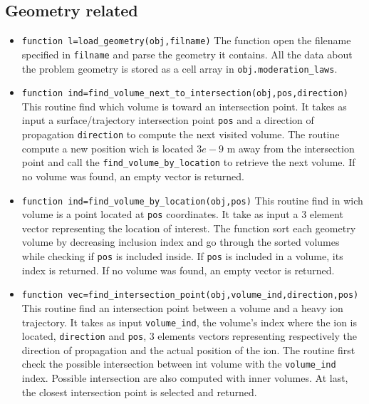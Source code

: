 \documentclass[10pt]{article}
\begin{document}
		\subsection{Geometry related}
		\begin{itemize}
		\item \lstinline{function l=load_geometry(obj,filname)} The function open the filename specified in \lstinline{filname} and parse the geometry it contains. All the data about the problem geometry is stored as a cell array in \lstinline{obj.moderation_laws}.
		\item \lstinline{function ind=find_volume_next_to_intersection(obj,pos,direction)} This  routine find which volume is toward an intersection point. It takes as input a surface/trajectory intersection point \lstinline{pos} and a direction of propagation \lstinline{direction} to compute the next visited volume. The routine compute a new position wich is located $3e-9$ m away from the intersection point and call the \lstinline{find_volume_by_location} to retrieve the next volume. If no volume was found, an empty vector is returned. 
		\item \lstinline{function ind=find_volume_by_location(obj,pos)} This routine find in wich volume is a point located  at \lstinline{pos} coordinates. It take as input a 3 element vector representing the location of interest. The function sort each geometry volume by decreasing inclusion index and go through the sorted volumes while checking if \lstinline{pos} is included inside. If \lstinline{pos} is included in a volume, its index is returned. If no volume was found, an empty vector is returned.
		\item \lstinline{function vec=find_intersection_point(obj,volume_ind,direction,pos)} This routine find an intersection point between a volume and a heavy ion trajectory. It takes as input \lstinline{volume_ind}, the volume's index where the ion is located, \lstinline{direction} and \lstinline{pos}, 3 elements vectors representing respectively the direction of propagation and the actual position of the ion. The routine first check the possible intersection between int volume with the  \lstinline{volume_ind} index. Possible intersection are also computed with inner volumes. At last, the closest intersection point is selected and returned.
		 

\end{itemize}
\end{document}

